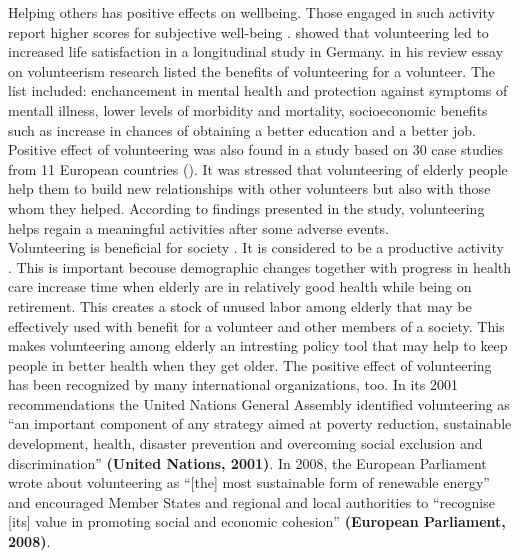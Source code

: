 \documentclass[10pt, letterpaper]{article}
\begin{document}
\begin{spacing}{1.4}
Helping others has positive effects on wellbeing. Those engaged in such activity report higher scores for subjective well-being \citep{haski09,morrow2003,thoits03,whillans2016}. \citep{meier08} showed that volunteering led to increased life satisfaction in a longitudinal study in Germany. \citet{wilson12} in his review essay on volunteerism research  listed the benefits of volunteering for a volunteer. The list included: enchancement in mental health and protection against symptoms of mentall illness, lower levels of morbidity and mortality, socioeconomic benefits such as increase in chances of obtaining a better education and a better job. Positive effect of volunteering was also found in a study based on 30 case studies from 11 European countries (\citet{ehlers11}). It was stressed that volunteering of elderly people help them to build new relationships with other volunteers but also with those whom they helped. According to findings presented in the study,  volunteering helps regain a meaningful activities after some adverse events.   \\

Volunteering is beneficial for society \citep{Oecd15,prouteau06}. It is considered to be a productive activity \citep{hank09}. This is important becouse demographic changes together with progress in health care increase time when elderly  are in relatively good health while being on retirement. This creates a stock of unused labor among elderly that may be effectively used with benefit for a volunteer and other members of a society.  This makes volunteering among elderly an intresting policy tool that may help to keep people in better health when they get older. The positive effect of volunteering has been recognized by many international organizations, too. In its 2001 recommendations the United Nations General Assembly identified volunteering as “an important component of any strategy aimed at poverty reduction, sustainable development, health, disaster prevention and overcoming social exclusion and discrimination” \textbf{(United Nations, 2001)}. In 2008, the European Parliament wrote about volunteering as “[the] most sustainable form of renewable energy” and encouraged Member States and regional and local authorities to “recognise [its] value in promoting social and economic cohesion” \textbf{(European Parliament, 2008)}. \\


\end{spacing}
\end{document}
